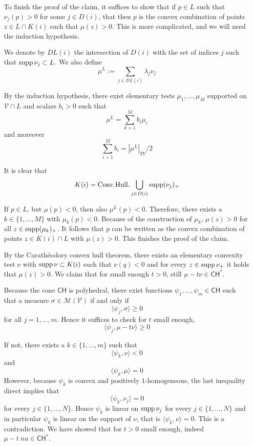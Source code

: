 \documentclass[12pt]{amsart}
\begin{document}
\begin{Proof}
	To finish the proof of the claim, it suffices to show that if $p \in L$ such that $\nu_j(p) > 0$ for some $j \in D(i)$, that then $p$ is the convex combination of points $z \in L \cap K(i)$ such that $\mu(z) > 0$. This is more complicated, and we will need the induction hypothesis.
		
	We denote by $DL(i)$ the intersection of $D(i)$ with the set of indices $j$ such that $\operatorname{\mathrm{supp}} \nu_j \subset L$. We also define
	\[
	\mu^L := \sum_{j \in DL(i)} \lambda_j \nu_j
	\]
	
	
	
	By the induction hypothesis, there exist elementary tests $\mu_1, \dots, \mu_M$ supported on $\mathcal{V} \cap L$ and scalars $b_i > 0$ such that
	\[
	\mu^L = \sum_{k = 1}^M b_i \mu_i
	\]
	and moreover 
	\[
	\sum_{i=1}^{M} b_i = |\mu^L|_{TV} / 2
	\]
		
	
	It is clear that
	\[
	K(i) = \mathrm{Conv.Hull.} \bigcup_{j \in D(i)} \operatorname{\mathrm{supp}} (\nu_j)_+
	\]
	

	If $p \in L$, but $\mu(p) < 0$, then also $\mu^L(p) < 0$. Therefore, there exists a $k \in \{1, \dots, M\}$ with $\mu_k (p) < 0$. Because of the construction of $\mu_k$, $\mu(z) > 0$ for all $z \in \operatorname{\mathrm{supp}} (\mu_k)_+$. It follows that $p$ can be written as the convex combination of points $z \in K(i) \cap L$ with $\mu(z) > 0$. This finishes the proof of the claim.
	
	By the Carath\'eodory convex hull theorem, there exists an elementary convexity test $\nu$ with $\operatorname{\mathrm{supp}} \nu \subset K(i)$ such that $\nu(q) < 0$ and for every $z \in \operatorname{\mathrm{supp}} \nu_+$ it holds that $\mu(z) > 0$. We claim that for small enough $t > 0$, still
	$\mu - t \nu \in \mathsf{CH}^*$.

	Because the cone $\mathsf{CH}$ is polyhedral, there exist functions $\psi_1, \dots, \psi_m \in \mathsf{CH}$ such that a measure $\sigma \in \mathcal{M}(\mathcal{V})$ if and only if
	\[
	\langle \psi_j, \sigma \rangle  \geq 0
	\]
	for all $j =1, \dots, m$.  Hence it suffices to check for $t$ small enough,
	\[
	\langle \psi_j, \mu - t \nu \rangle \geq 0
	\]
	
	If not, there exists a $k \in \{1, \dots, m \}$ such that 
	\[
		\langle \psi_k, \nu \rangle < 0
	\]	
	and 
	\[
		\langle \psi_k, \mu \rangle = 0
	\] 
	However, because $\psi_k$ is convex and positively $1$-homogeneous, the last inequality direct implies that
	\[
	\langle \psi_k, \nu_j \rangle = 0
	\]
	for every $j \in \{1, \dots, N\}$. Hence $\psi_k$ is linear on $\operatorname{\mathrm{supp}} \nu_j$ for every $j \in \{1, \dots, N\}$ and in particular $\psi_k$ is linear on the support of $\nu$, that is $\langle \psi_k, \nu \rangle = 0$. This is a contradiction. We have showed that for $t > 0$ small enough, indeed $\mu - t\ nu \in \mathsf{CH}^*$.
	

\end{Proof}
\end{document}
